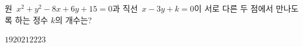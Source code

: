 원~$x^2+y^2-8x+6y+15=0$과 직선~$x-3y+k=0$이 서로 다른 두 점에서 만나도록 하는 정수 $k$의 개수는?
\begin{choices32}{$19$}{$20$}{$21$}{$22$}{$23$}\end{choices32}
